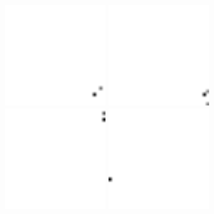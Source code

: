 \begin{figure}
	\centering
	\begin{subfigure}[b]{0.3\textwidth}
		\includegraphics[width=0.48\textwidth]{mRFP_1}
		\includegraphics[width=0.48\textwidth]{mRFP_2} \\[2pt]
		\includegraphics[width=0.48\textwidth]{mRFP_3}
		\includegraphics[width=0.48\textwidth]{mRFP_4}

\end{subfigure}
\end{figure}
